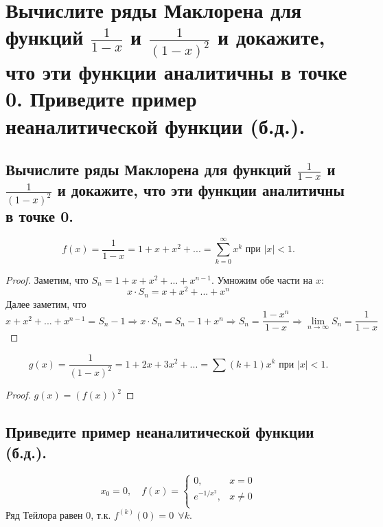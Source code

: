 \section{Вычислите ряды Маклорена для функций $\frac{1}{1-x}$ и $\frac{1}{(1-x)^2}$ и докажите, что эти функции аналитичны в точке 0. Приведите пример неаналитической функции (б.д.).}

\subsection{Вычислите ряды Маклорена для функций $\frac{1}{1-x}$ и $\frac{1}{(1-x)^2}$ и докажите, что эти функции аналитичны в точке 0.}
\begin{statement}
    \[
        f(x) = \frac{1}{1-x} = 1 + x + x^2 + ... = \sum_{k=0}^{\infty} x^k
        \text{ при } |x| < 1.
    \]
    \begin{proof}
        Заметим, что $S_n = 1 + x + x^2 + ... + x^{n-1}$. Умножим обе части на $x$:
        \[
            x \cdot S_n = x + x^2 + ... + x^n
        \]
        Далее заметим, что
        \[
            x + x^2 + ... + x^{n-1} = S_n - 1 \Rightarrow
            x \cdot S_n = S_n - 1 + x^n \Rightarrow
            S_n = \frac{1 - x^n}{1 - x} \Rightarrow
            \lim_{n \to \infty} S_n = \frac{1}{1 - x}
        \]
    \end{proof}
\end{statement}
\begin{statement}
    \[
        g(x) = \frac{1}{(1 - x)^2} = 1 + 2x + 3x^2 + ... = \sum (k+1) x^k
        \text{ при } |x| < 1.
    \]
    \begin{proof}
        $g(x) = (f(x))^2$
    \end{proof}
\end{statement}


\subsection{Приведите пример неаналитической функции (б.д.).}
\[
    x_0 = 0,
    \quad
    f(x) =
    \begin{cases}
        0, & x = 0 \\
        e^{-1/x^2}, & x \neq 0 \\
    \end{cases}
\]
Ряд Тейлора равен 0, т.к. $f^{(k)}(0) = 0 \> \> \forall k$.